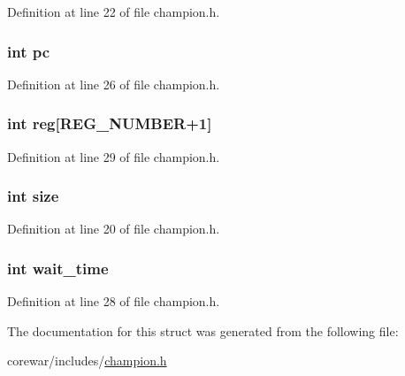 Definition at line 22 of file champion.\-h.

\hypertarget{structs__champion_ac8c81e61335635fa4709d82412b31f06}{
\subsubsection[{pc}]{\setlength{\rightskip}{0pt plus 5cm}int pc}}\label{structs__champion_ac8c81e61335635fa4709d82412b31f06}


Definition at line 26 of file champion.\-h.

\hypertarget{structs__champion_a205e2cf1e11ba6a2f7110d4b650e971c}{
\subsubsection[{reg}]{\setlength{\rightskip}{0pt plus 5cm}int reg\mbox{[}{\bf R\-E\-G\-\_\-\-N\-U\-M\-B\-E\-R}+1\mbox{]}}}\label{structs__champion_a205e2cf1e11ba6a2f7110d4b650e971c}


Definition at line 29 of file champion.\-h.

\hypertarget{structs__champion_a439227feff9d7f55384e8780cfc2eb82}{
\subsubsection[{size}]{\setlength{\rightskip}{0pt plus 5cm}int size}}\label{structs__champion_a439227feff9d7f55384e8780cfc2eb82}


Definition at line 20 of file champion.\-h.

\hypertarget{structs__champion_a1853c17443a5893d3acd539b3c7a9289}{
\subsubsection[{wait\-\_\-time}]{\setlength{\rightskip}{0pt plus 5cm}int wait\-\_\-time}}\label{structs__champion_a1853c17443a5893d3acd539b3c7a9289}


Definition at line 28 of file champion.\-h.



The documentation for this struct was generated from the following file\-:\begin{DoxyCompactItemize}
\item 
corewar/includes/\hyperlink{champion_8h}{champion.\-h}\end{DoxyCompactItemize}
